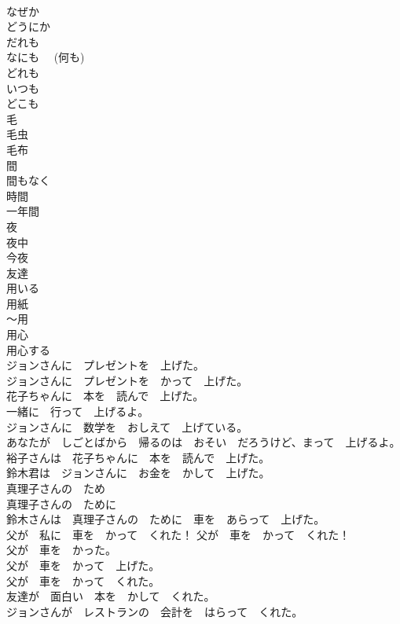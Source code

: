 \documentclass[8pt]{extreport}
\begin{document}
\begin{CJK}{UTF8}{min}
\\	なぜか	
\\	どうにか	
\\	だれも	
\\	なにも　 (何も)	
\\	どれも	
\\	いつも	
\\	どこも	
\\	毛	
\\	毛虫	
\\	毛布	
\\	間	
\\	間もなく	
\\	時間	
\\	一年間	
\\	夜	
\\	夜中	
\\	今夜	
\\	友達	
\\	用いる	
\\	用紙	
\\	～用	
\\	用心	
\\	用心する	
\\	ジョンさんに　プレゼントを　上げた。	
\\	ジョンさんに　プレゼントを　かって　上げた。	
\\	花子ちゃんに　本を　読んで　上げた。	
\\	一緒に　行って　上げるよ。	
\\	ジョンさんに　数学を　おしえて　上げている。	
\\	あなたが　しごとばから　帰るのは　おそい　だろうけど、まって　上げるよ。	
\\	裕子さんは　花子ちゃんに　本を　読んで　上げた。	
\\	鈴木君は　ジョンさんに　お金を　かして　上げた。	
\\	真理子さんの　ため	
\\	真理子さんの　ために	
\\	鈴木さんは　真理子さんの　ために　車を　あらって　上げた。	
\\	父が　私に　車を　かって　くれた！ 父が　車を　かって　くれた！	
\\	父が　車を　かった。	
\\	父が　車を　かって　上げた。	
\\	父が　車を　かって　くれた。	
\\	友達が　面白い　本を　かして　くれた。	
\\	ジョンさんが　レストランの　会計を　はらって　くれた。	

\end{CJK}
\end{document}
